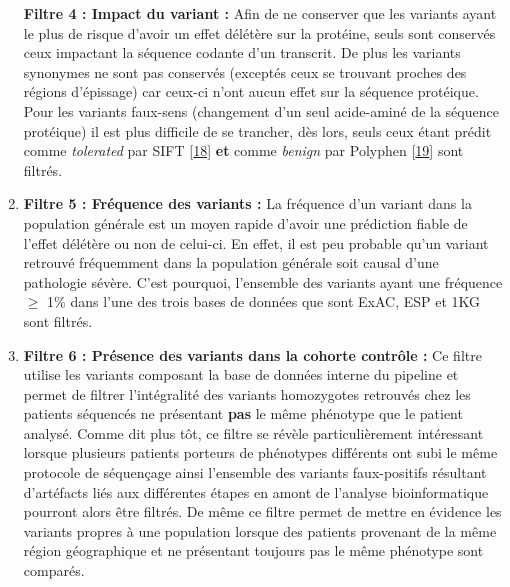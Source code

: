 \documentclass[12pt,twoside]{ugathesis}
\begin{document}
\begin{enumerate}
  \textbf{Filtre 4 : Impact du variant :} Afin de ne conserver que les
  variants ayant le plus de risque d'avoir un effet délétère sur la
  protéine, seuls sont conservés ceux impactant la séquence codante d'un
  transcrit. De plus les variants synonymes ne sont pas conservés
  (exceptés ceux se trouvant proches des régions d'épissage) car ceux-ci
  n'ont aucun effet sur la séquence protéique. Pour les variants
  faux-sens (changement d'un seul acide-aminé de la séquence protéique)
  il est plus difficile de se trancher, dès lors, seuls ceux étant
  prédit comme \emph{tolerated} par SIFT
  {[}\protect\hyperlink{ref-Kumar2009}{18}{]} \textbf{et} comme
  \emph{benign} par Polyphen
  {[}\protect\hyperlink{ref-Adzhubei2010}{19}{]} sont filtrés.
\item
  \textbf{Filtre 5 : Fréquence des variants :} La fréquence d'un variant
  dans la population générale est un moyen rapide d'avoir une prédiction
  fiable de l'effet délétère ou non de celui-ci. En effet, il est peu
  probable qu'un variant retrouvé fréquemment dans la population
  générale soit causal d'une pathologie sévère. C'est pourquoi,
  l'ensemble des variants ayant une fréquence \(\ge\) 1\% dans l'une des
  trois bases de données que sont ExAC, ESP et 1KG sont filtrés.
\item
  \textbf{Filtre 6 : Présence des variants dans la cohorte contrôle :}
  Ce filtre utilise les variants composant la base de données interne du
  pipeline et permet de filtrer l'intégralité des variants homozygotes
  retrouvés chez les patients séquencés ne présentant \textbf{pas} le
  même phénotype que le patient analysé. Comme dit plus tôt, ce filtre
  se révèle particulièrement intéressant lorsque plusieurs patients
  porteurs de phénotypes différents ont subi le même protocole de
  séquençage ainsi l'ensemble des variants faux-positifs résultant
  d'artéfacts liés aux différentes étapes en amont de l'analyse
  bioinformatique pourront alors être filtrés. De même ce filtre permet
  de mettre en évidence les variants propres à une population lorsque
  des patients provenant de la même région géographique et ne présentant
  toujours pas le même phénotype sont comparés.
\end{enumerate}
\end{document}
